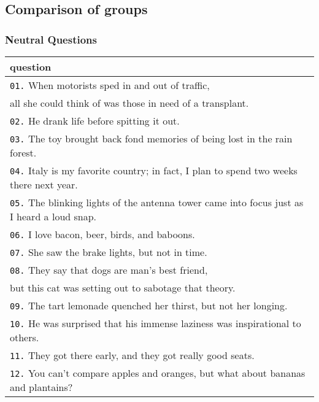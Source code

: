 \documentclass[11pt, twoside, reqno]{book}
\begin{document}
\subsection{Comparison of groups}


\subsubsection{\textbf{Neutral Questions}}

\begin{table}[h!]
    \raggedright
    \begin{tabular}{|l|}
    \hline
        question \\ \hline
        \texttt{01.}\hspace{8pt} When motorists sped in and out of traffic,\\\hspace{24pt} all she could think of was those in need of a transplant. \\ \hline
        \texttt{02.}\hspace{8pt} He drank life before spitting it out. \\ \hline
        \texttt{03.}\hspace{8pt} The toy brought back fond memories of being lost in the rain forest. \\ \hline
        \texttt{04.}\hspace{8pt} Italy is my favorite country; in fact, I plan to spend two weeks there next year. \\ \hline
        \texttt{05.}\hspace{8pt} The blinking lights of the antenna tower came into focus just as I heard a loud snap. \\ \hline
        \texttt{06.}\hspace{8pt} I love bacon, beer, birds, and baboons. \\ \hline
        \texttt{07.}\hspace{8pt} She saw the brake lights, but not in time. \\ \hline
        \texttt{08.}\hspace{8pt} They say that dogs are man's best friend, \\\hspace{24pt} but this cat was setting out to sabotage that theory. \\ \hline
        \texttt{09.}\hspace{8pt} The tart lemonade quenched her thirst, but not her longing. \\ \hline
        \texttt{10.}\hspace{8pt} He was surprised that his immense laziness was inspirational to others. \\ \hline
        \texttt{11.}\hspace{8pt} They got there early, and they got really good seats. \\ \hline
        \texttt{12.}\hspace{8pt} You can't compare apples and oranges, but what about bananas and plantains? \\ \hline
    \end{tabular}
\end{table}
\end{document}
